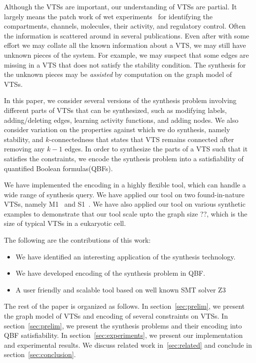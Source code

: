 %
Although the VTSs are important, our understanding of VTSs are partial.
%
It largely means the patch work of wet experiments~\cite{model} for
identifying the compartments, channels, molecules, their activity, and
regulatory control.
%
Often the information is scattered around in several publications.
%
Even after with some effort we may collate all the known information about
a VTS, we may still have unknown pieces of the system.
%
%
For example, we may suspect that some edges are missing in a VTS that
does not satisfy the stability condition.
%
The synthesis for the unknown pieces may be {\em assisted} by computation on
the graph model of VTSs.
%

In this paper, we consider several versions of the synthesis problem
involving different parts of VTSs that can be synthesized, such as
modifying labels, adding/deleting edges, learning activity functions,
and adding nodes.
%
We also consider variation on the properties against which we do synthesis,
namely stability, and $k$-connectedness that states
that VTS remains connected after removing any $k-1$ edges.
%
In order to synthesize the parts of a VTS such that it satisfies the
constraints, we encode the synthesis problem into a satisfiability of
quantified Boolean formulas(QBFs). 
%

We have implemented the encoding in a highly flexible tool,
which can handle a wide range of synthesis query.
%
We have applied our tool on two found-in-nature VTSs, namely
M1~\cite{} and S1~\cite{}.
%
We have also applied our tool on various synthetic examples to
demonstrate that our tool scale upto the graph size ??, which
is the size of typical VTSs in a eukaryotic cell.

The following are the contributions of this work:
\begin{itemize}
\item We have identified an interesting application of
  the synthesis technology.
\item We have developed encoding of the synthesis problem in QBF.
\item A user friendly and scalable tool based on well known SMT solver Z3
\end{itemize}

The rest of the paper is organized as follows.
%
In section~\ref{sec:prelim}, we present the graph model of VTSs and encoding of several
constraints on VTSs.
%
In section~\ref{sec:prelim}, we present the synthesis problems and their
encoding into QBF satisfiability.
%
In section~\ref{sec:experiments}, we present our implementation and experimental results.
%
We discuss related work in~\ref{sec:related} and conclude in section~\ref{sec:conclusion}.



